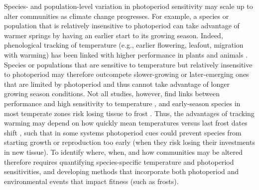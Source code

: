 \documentclass{article}
\begin{document}
\par Species- and population-level variation in photoperiod sensitivity may scale up to alter communities as climate change progresses. For example, a species or population that is relatively insensitive to photoperiod can take advantage of warmer springs by having an earlier start to its growing season. Indeed, phenological tracking of temperature (e.g., earlier flowering, leafout, migration with warming) has been linked with higher performance in plants and animals \citep{cleland2012,muir1994,willis2010}. Species or populations that are sensitive to temperature but relatively insensitive to photoperiod may therefore outcompete slower-growing or later-emerging ones that are limited by photoperiod and thus cannot take advantage of longer growing season conditions. Not all studies, however, find links between performance and high sensitivity to temperature \citep[e.g.,][]{block2020}, and early-season species in most temperate zones risk losing tissue to frost \citep{frostbook}. Thus, the advantages of tracking warming may depend on how quickly mean temperatures versus last frost dates shift \citep[e.g.,][]{inouye2002}, such that in some systems photoperiod cues could prevent species from starting growth or reproduction too early (when they risk losing their investments in new tissue). To identify where, when, and how communities may be altered therefore requires quantifying species-specific temperature and photoperiod sensitivities, and developing methods that incorporate both photoperiod and environmental events that impact fitness (such as frosts).
\end{document}
